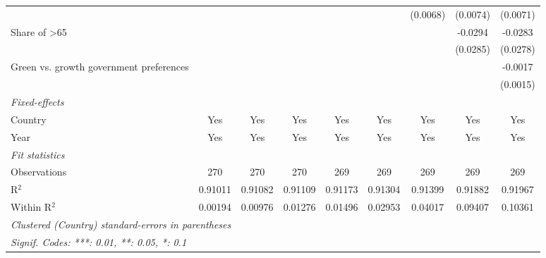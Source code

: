 \begin{table}[htbp]
\begin{tabular}{lcccccccc}
                                                     &          &          &          &          &          & (0.0068) & (0.0074) & (0.0071)\\   
      Share of >65                                   &          &          &          &          &          &          & -0.0294  & -0.0283\\   
                                                     &          &          &          &          &          &          & (0.0285) & (0.0278)\\   
      Green vs. growth government preferences        &          &          &          &          &          &          &          & -0.0017\\   
                                                     &          &          &          &          &          &          &          & (0.0015)\\   
      \midrule
      \emph{Fixed-effects}\\
      Country                                        & Yes      & Yes      & Yes      & Yes      & Yes      & Yes      & Yes      & Yes\\  
      Year                                           & Yes      & Yes      & Yes      & Yes      & Yes      & Yes      & Yes      & Yes\\  
      \midrule
      \emph{Fit statistics}\\
      Observations                                   & 270      & 270      & 270      & 269      & 269      & 269      & 269      & 269\\  
      R$^2$                                          & 0.91011  & 0.91082  & 0.91109  & 0.91173  & 0.91304  & 0.91399  & 0.91882  & 0.91967\\  
      Within R$^2$                                   & 0.00194  & 0.00976  & 0.01276  & 0.01496  & 0.02953  & 0.04017  & 0.09407  & 0.10361\\  
      \midrule \midrule
      \multicolumn{9}{l}{\emph{Clustered (Country) standard-errors in parentheses}}\\
      \multicolumn{9}{l}{\emph{Signif. Codes: ***: 0.01, **: 0.05, *: 0.1}}\\
   \end{tabular}
\end{table}


